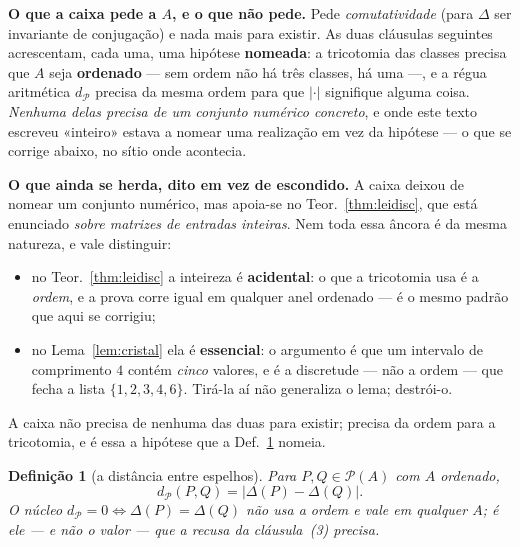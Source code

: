 \documentclass[11pt,a4paper]{article}
\newtheorem{definicao}[teorema]{Definição}
\begin{document}
\medskip\noindent\textbf{O que a caixa pede a $A$, e o que não pede.} Pede
\emph{comutatividade} (para $\Delta$ ser invariante de conjugação) e nada mais
para existir. As duas cláusulas seguintes acrescentam, cada uma, uma hipótese
\textbf{nomeada}: a tricotomia das classes precisa que $A$ seja \textbf{ordenado}
--- sem ordem não há três classes, há uma ---, e a régua aritmética
$d_{\mathcal{P}}$ precisa da mesma ordem para que $\lvert\cdot\rvert$ signifique
alguma coisa. \emph{Nenhuma delas precisa de um conjunto numérico concreto}, e
onde este texto escreveu «inteiro» estava a nomear uma realização em vez da
hipótese --- o que se corrige abaixo, no sítio onde acontecia.

\medskip\noindent\textbf{O que ainda se herda, dito em vez de escondido.} A
caixa deixou de nomear um conjunto numérico, mas apoia-se no
Teor.~\ref{thm:leidisc}, que está enunciado \emph{sobre matrizes de entradas
inteiras}. Nem toda essa âncora é da mesma natureza, e vale distinguir:
\begin{itemize}\itemsep2pt
\item no Teor.~\ref{thm:leidisc} a inteireza é \textbf{acidental}: o que a
  tricotomia usa é a \emph{ordem}, e a prova corre igual em qualquer anel
  ordenado --- é o mesmo padrão que aqui se corrigiu;
\item no Lema~\ref{lem:cristal} ela é \textbf{essencial}: o argumento é que um
  intervalo de comprimento $4$ contém \emph{cinco} valores, e é a discretude ---
  não a ordem --- que fecha a lista $\{1,2,3,4,6\}$. Tirá-la aí não generaliza o
  lema; destrói-o.
\end{itemize}
\noindent A caixa não precisa de nenhuma das duas para existir; precisa da ordem
para a tricotomia, e é essa a hipótese que a Def.~\ref{def:pandora} nomeia.

\begin{definicao}[a distância entre espelhos]\label{def:pandora}
Para $P,Q\in\mathcal{P}(A)$ com $A$ ordenado,
\[
d_{\mathcal{P}}(P,Q)=\bigl\lvert\Delta(P)-\Delta(Q)\bigr\rvert .
\]
O \emph{núcleo} $d_{\mathcal{P}}=0\iff\Delta(P)=\Delta(Q)$ não usa a ordem e vale
em qualquer $A$; é ele --- e não o valor --- que a recusa da cláusula~(3) precisa.
\end{definicao}
\end{document}
